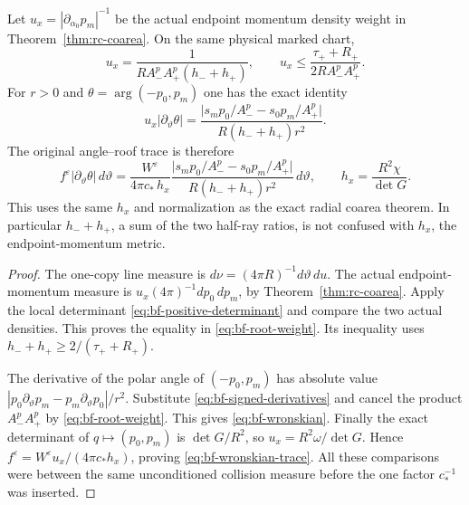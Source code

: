 \begin{corollary}
\label{cor:bf-wronskian}
Let $u_x=|\partial_{\alpha_0}p_m|^{-1}$ be the actual endpoint
momentum density weight in Theorem~\ref{thm:rc-coarea}.  On the same
physical marked chart,
\begin{equation}\label{eq:bf-root-weight}
 u_x=\frac1{R A_-^p A_+^p(h_-+h_+)},\qquad
 u_x\le\frac{\tau_++R_+}{2R A_-^p A_+^p}.
\end{equation}
For $r>0$ and $\theta=\arg(-p_0,p_m)$ one has the exact identity
\begin{equation}\label{eq:bf-wronskian}
 u_x|\partial_\vartheta\theta|
 =\frac{
       \bigl|s_m p_0/A_-^p-s_0 p_m/A_+^p\bigr|}
        {R(h_-+h_+)r^2}.
\end{equation}
The original angle--roof trace is therefore
\begin{equation}\label{eq:bf-wronskian-trace}
 f^\varepsilon|\partial_\vartheta\theta|\,d\vartheta
 =\frac{W^\varepsilon}{4\pi c_*\,h_x}
   \frac{\bigl|s_m p_0/A_-^p-s_0 p_m/A_+^p\bigr|}
        {R(h_-+h_+)r^2}\,d\vartheta,
 \qquad h_x=\frac{R^2\chi}{\det G}.
\end{equation}
This uses the same $h_x$ and normalization as the exact radial
coarea theorem.  In particular $h_-+h_+$, a sum of the two half-ray
ratios, is not confused with $h_x$, the endpoint-momentum metric.
\end{corollary}
\begin{proof}
The one-copy line measure is
$d\nu=(4\pi R)^{-1}d\vartheta\,du$.  The actual endpoint-momentum
measure is $u_x(4\pi)^{-1}dp_0\,dp_m$, by
Theorem~\ref{thm:rc-coarea}.  Apply the local determinant
\eqref{eq:bf-positive-determinant} and compare the two actual
densities.  This proves the equality in \eqref{eq:bf-root-weight}.
Its inequality uses $h_-+h_+\ge2/(\tau_++R_+)$.

The derivative of the polar angle of $(-p_0,p_m)$ has absolute
value $|p_0\partial_\vartheta p_m-
p_m\partial_\vartheta p_0|/r^2$.  Substitute
\eqref{eq:bf-signed-derivatives} and cancel the product
$A_-^p A_+^p$ by \eqref{eq:bf-root-weight}.  This gives
\eqref{eq:bf-wronskian}.  Finally the exact determinant of
$q\mapsto(p_0,p_m)$ is $\det G/R^2$, so
$u_x=R^2\omega/\det G$.  Hence
$f^\varepsilon=W^\varepsilon u_x/(4\pi c_*h_x)$, proving
\eqref{eq:bf-wronskian-trace}.  All these comparisons were between
the same unconditioned collision measure before the one factor
$c_*^{-1}$ was inserted.
\end{proof}

